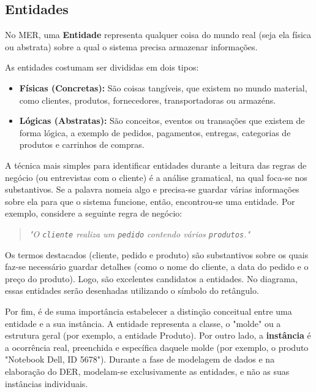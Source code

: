 \subsection{Entidades}

No MER, uma \textbf{Entidade} representa qualquer coisa do mundo real (seja ela física ou abstrata) sobre a qual o sistema precisa armazenar informações.

As entidades costumam ser divididas em dois tipos:
\begin{itemize}
    \item \textbf{Físicas (Concretas):} São coisas tangíveis, que existem no mundo material, como clientes, produtos, fornecedores, transportadoras ou armazéns.
    \item \textbf{Lógicas (Abstratas):} São conceitos, eventos ou transações que existem de forma lógica, a exemplo de pedidos, pagamentos, entregas, categorias de produtos e carrinhos de compras.
\end{itemize}

A técnica mais simples para identificar entidades durante a leitura das regras de negócio (ou entrevistas com o cliente) é a análise gramatical, na qual foca-se nos substantivos. Se a palavra nomeia algo e precisa-se guardar várias informações sobre ela para que o sistema funcione, então, encontrou-se uma entidade. Por exemplo, considere a seguinte regra de negócio: 

\begin{quote}
\textit{"O \texttt{cliente} realiza um \texttt{pedido} contendo vários \texttt{produtos}."}
\end{quote}

Os termos destacados (cliente, pedido e produto) são substantivos sobre os quais faz-se necessário guardar detalhes (como o nome do cliente, a data do pedido e o preço do produto). Logo, são excelentes candidatos a entidades. No diagrama, essas entidades serão desenhadas utilizando o símbolo do retângulo.

Por fim, é de suma importância estabelecer a distinção conceitual entre uma entidade e a sua instância. A entidade representa a classe, o "molde" ou a estrutura geral (por exemplo, a entidade Produto). Por outro lado, a \textbf{instância} é a ocorrência real, preenchida e específica daquele molde (por exemplo, o produto "Notebook Dell, ID 5678"). Durante a fase de modelagem de dados e na elaboração do DER, modelam-se exclusivamente as entidades, e não as suas instâncias individuais.

